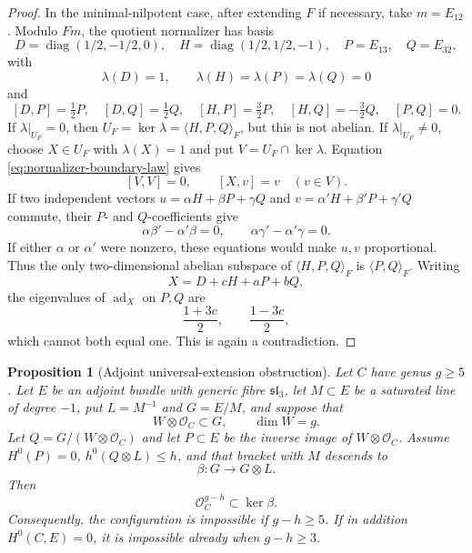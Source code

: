 \documentclass[11pt]{article}
\newtheorem{proposition}[theorem]{Proposition}
\theoremstyle{definition}
\newcommand{\Ocal}{\mathcal O}
\newcommand{\ad}{\operatorname{ad}}
\begin{document}
\begin{proof}
In the minimal-nilpotent case, after extending $F$ if necessary, take
$m=E_{12}$.  Modulo $Fm$, the quotient normalizer has basis
\[
 D=\operatorname{diag}(1/2,-1/2,0),\quad
 H=\operatorname{diag}(1/2,1/2,-1),\quad
 P=E_{13},\quad Q=E_{32},
\]
with
\[
 \lambda(D)=1,\qquad \lambda(H)=\lambda(P)=\lambda(Q)=0
\]
and
\[
 [D,P]=\tfrac12P,\quad [D,Q]=\tfrac12Q,\quad
 [H,P]=\tfrac32P,\quad [H,Q]=-\tfrac32Q,\quad [P,Q]=0.
\]
If $\lambda|_{U_F}=0$, then
$U_F=\ker\lambda=\langle H,P,Q\rangle_F$, but this is not abelian.
If $\lambda|_{U_F}\ne0$, choose $X\in U_F$ with $\lambda(X)=1$ and put
$V=U_F\cap\ker\lambda$.  Equation
\eqref{eq:normalizer-boundary-law} gives
\[
 [V,V]=0,\qquad [X,v]=v\quad(v\in V).
\]
If two independent vectors
$u=\alpha H+\beta P+\gamma Q$ and
$v=\alpha' H+\beta' P+\gamma' Q$ commute, their $P$- and $Q$-coefficients
give
\[
 \alpha\beta'-\alpha'\beta=0,
 \qquad
 \alpha\gamma'-\alpha'\gamma=0.
\]
If either $\alpha$ or $\alpha'$ were nonzero, these equations would make
$u,v$ proportional.  Thus the only two-dimensional abelian subspace of
$\langle H,P,Q\rangle_F$ is $\langle P,Q\rangle_F$.  Writing
\[
 X=D+cH+aP+bQ,
\]
the eigenvalues of $\ad_X$ on $P,Q$ are
\[
 \frac{1+3c}{2},\qquad\frac{1-3c}{2},
\]
which cannot both equal one.  This is again a contradiction.
\end{proof}

\begin{proposition}[Adjoint universal-extension obstruction]
\label{prop:adjoint-universal}
Let $C$ have genus $g\ge5$.  Let $E$ be an adjoint bundle with generic
fibre $\mathfrak{sl}_3$, let $M\subset E$ be a saturated line of degree
$-1$, put $L=M^{-1}$ and $G=E/M$, and suppose that
\[
 W\otimes\Ocal_C\subset G,
 \qquad \dim W=g.
\]
Let $Q=G/(W\otimes\Ocal_C)$ and let $P\subset E$ be the inverse image of
$W\otimes\Ocal_C$.  Assume $H^0(P)=0$, $h^0(Q\otimes L)\le h$, and that
bracket with $M$ descends to
\[
 \beta:G\longrightarrow G\otimes L.
\]
Then
\[
 \Ocal_C^{g-h}\subset\ker\beta.
\]
Consequently, the configuration is impossible if $g-h\ge5$.  If in
addition $H^0(C,E)=0$, it is impossible already when $g-h\ge3$.
\end{proposition}
\end{document}
